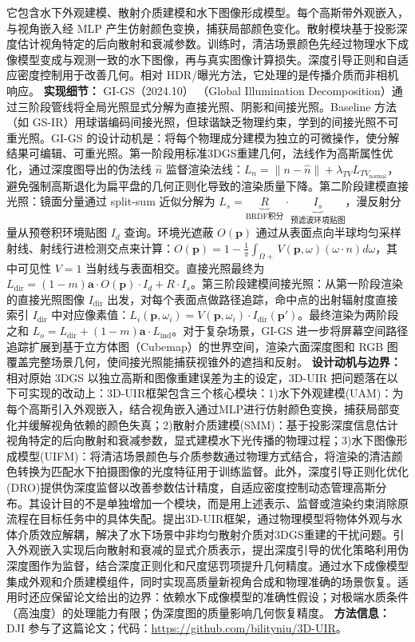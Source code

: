 它包含水下外观建模、散射介质建模和水下图像形成模型。每个高斯带外观嵌入，与视角嵌入经 MLP 产生仿射颜色变换，捕获局部颜色变化。散射模块基于投影深度估计视角特定的后向散射和衰减参数。训练时，清洁场景颜色先经过物理水下成像模型变成与观测一致的水下图像，再与真实图像计算损失。深度引导正则和自适应密度控制用于改善几何。相对 HDR/曝光方法，它处理的是传播介质而非相机响应。
\textbf{实现细节：} GI-GS（2024.10） （Global Illumination Decomposition）通过三阶段管线将全局光照显式分解为直接光照、阴影和间接光照。Baseline 方法（如 GS-IR）用球谐编码间接光照，但球谐缺乏物理约束，学到的间接光照不可重光照。GI-GS 的设计动机是：将每个物理成分建模为独立的可微操作，使分解结果可编辑、可重光照。第一阶段用标准3DGS重建几何，法线作为高斯属性优化，通过深度图导出的伪法线 $\hat{n}$ 监督渲染法线：$L_n = \|n - \hat{n}\| + \lambda_{TV} L_{TV_{\mathrm{normal}}}$，避免强制高斯退化为扁平盘的几何正则化导致的渲染质量下降。第二阶段建模直接光照：镜面分量通过 split-sum 近似分解为 $L_s = \underbrace{R}_{\mathrm{BRDF积分}} \cdot \underbrace{I_s}_{\mathrm{预滤波环境贴图}}$，漫反射分量从预卷积环境贴图 $I_d$ 查询。环境光遮蔽 $O(\mathbf{p})$ 通过从表面点向半球均匀采样射线、射线行进检测交点来计算：$O(\mathbf{p}) = 1 - \frac{1}{\pi}\int_{\Omega^{}+} V(\mathbf{p}, \omega) (\omega \cdot n) d\omega$，其中可见性 $V=1$ 当射线与表面相交。直接光照最终为 $L_{\mathrm{dir}} = (1-m)\boldsymbol{a} \cdot O(\mathbf{p}) \cdot I_d + R \cdot I_s$。第三阶段建模间接光照：从第一阶段渲染的直接光照图像 $I_{\mathrm{dir}}$ 出发，对每个表面点做路径追踪，命中点的出射辐射度直接索引 $I_{\mathrm{dir}}$ 中对应像素值：$L_i(\mathbf{p}, \omega_i) = V(\mathbf{p}, \omega_i) \cdot I_{\mathrm{dir}}(\mathbf{p}')$。最终渲染为两阶段之和 $L_o = L_{\mathrm{dir}} + (1-m)\boldsymbol{a} \cdot L_{\mathrm{ind}}$。对于复杂场景，GI-GS 进一步将屏幕空间路径追踪扩展到基于立方体图（Cubemap）的世界空间，渲染六面深度图和 RGB 图覆盖完整场景几何，使间接光照能捕获视锥外的遮挡和反射。
\textbf{设计动机与边界：} 相对原始 3DGS 以独立高斯和图像重建误差为主的设定，3D-UIR 把问题落在以下可实现的改动上：3D-UIR框架包含三个核心模块：1)水下外观建模(UAM)：为每个高斯引入外观嵌入，结合视角嵌入通过MLP进行仿射颜色变换，捕获局部变化并缓解视角依赖的颜色失真；2)散射介质建模(SMM)：基于投影深度信息估计视角特定的后向散射和衰减参数，显式建模水下光传播的物理过程；3)水下图像形成模型(UIFM)：将清洁场景颜色与介质参数通过物理方式结合，将渲染的清洁颜色转换为匹配水下拍摄图像的光度特征用于训练监督。此外，深度引导正则化优化(DRO)提供伪深度监督以改善参数估计精度，自适应密度控制动态管理高斯分布。其设计目的不是单独增加一个模块，而是用上述表示、监督或渲染约束消除原流程在目标任务中的具体失配。提出3D-UIR框架，通过物理模型将物体外观与水体介质效应解耦，解决了水下场景中非均匀散射介质对3DGS重建的干扰问题。引入外观嵌入实现后向散射和衰减的显式介质表示，提出深度引导的优化策略利用伪深度图作为监督，结合深度正则化和尺度惩罚项提升几何精度。通过水下成像模型集成外观和介质建模组件，同时实现高质量新视角合成和物理准确的场景恢复。适用时还应保留论文给出的边界：依赖水下成像模型的准确性假设；对极端水质条件（高浊度）的处理能力有限；伪深度图的质量影响几何恢复精度。
\textbf{方法信息：} DJI 参与了这篇论文；代码：\url{https://github.com/bilityniu/3D-UIR}。
